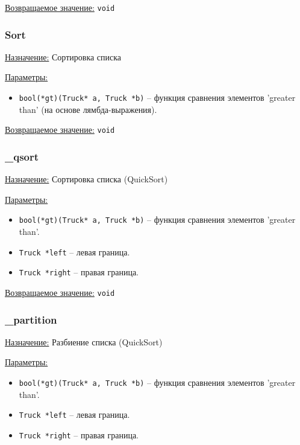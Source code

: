 \underline{Возвращаемое значение:} \verb|void|


\subsubsection*{Sort}

\underline{Назначение:} Сортировка списка

\underline{Параметры:} 

\begin{itemize}
    \item \verb|bool(*gt)(Truck* a, Truck *b)| -- функция сравнения элементов 'greater than' (на основе лямбда-выражения).
\end{itemize}

\underline{Возвращаемое значение:} \verb|void|


\subsubsection*{\_qsort}

\underline{Назначение:} Сортировка списка (QuickSort)

\underline{Параметры:} 

\begin{itemize}
    \item \verb|bool(*gt)(Truck* a, Truck *b)| -- функция сравнения элементов 'greater than'.
    \item \verb|Truck *left| -- левая граница.
    \item \verb|Truck *right| -- правая граница.
\end{itemize}

\underline{Возвращаемое значение:} \verb|void|


\subsubsection*{\_partition}

\underline{Назначение:} Разбиение списка (QuickSort)

\underline{Параметры:} 

\begin{itemize}
    \item \verb|bool(*gt)(Truck* a, Truck *b)| -- функция сравнения элементов 'greater than'.
    \item \verb|Truck *left| -- левая граница.
    \item \verb|Truck *right| -- правая граница.
\end{itemize}


